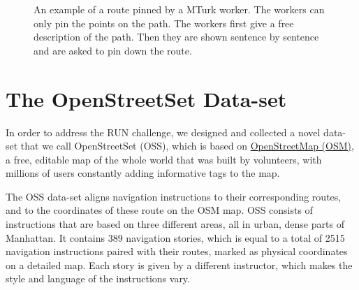 \documentclass[11pt,a4paper]{article}
\begin{document}
\begin{figure}[t]
\centering
{}
\caption 
        {An example of a route pinned by a MTurk worker. The workers can only pin the points on the path. The workers first give a free description of the path. Then they are shown sentence by sentence and are asked to pin down the route.} 
        
\label{fig:user_interface}
\end{figure}

 \begin{table*}[h]
 
     \centering
     \caption{Quantitative Comparison of the OSS to the HCRC, SAIL, and TTW Data-Sets}
     \label{table:statistic_maps}
     
 \end{table*}
 
 
 
\section{The OpenStreetSet Data-set}
\label{data}

In order to address the RUN challenge, we designed and collected a novel data-set that we call  OpenStreetSet (OSS), which is based on \href{http://www.openstreetmap.org}{OpenStreetMap (OSM)}, a free, editable map of the whole world that was built by volunteers, with millions of users constantly adding informative tags to the map.

The OSS data-set aligns navigation instructions to their corresponding  routes, and to the coordinates of these route on the OSM map. OSS consists of instructions  that are based on three different areas, all in urban, dense parts of Manhattan. 
It contains 389 navigation stories, which is equal to a total of 2515 navigation instructions paired with their routes, marked as physical coordinates on a detailed map. Each story is given by a different instructor, which makes the style and language of the instructions vary.
\end{document}
